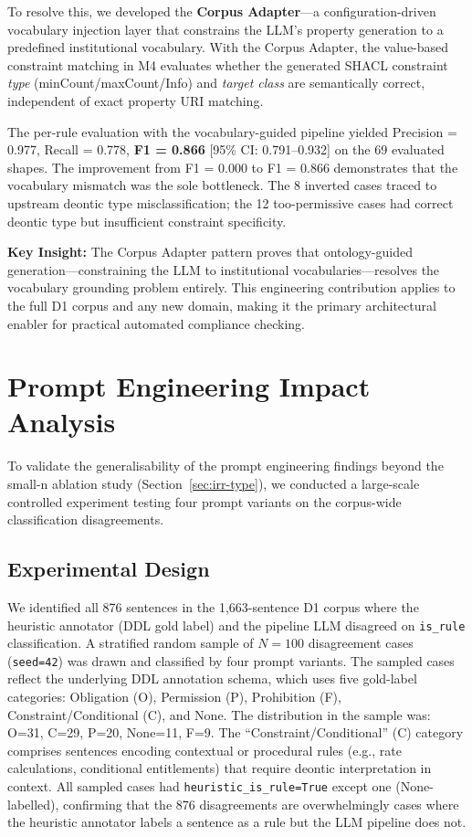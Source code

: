 To resolve this, we developed the \textbf{Corpus Adapter}---a configuration-driven vocabulary injection layer that constrains the LLM's property generation to a predefined institutional vocabulary. With the Corpus Adapter, the value-based constraint matching in M4 evaluates whether the generated SHACL constraint \textit{type} (minCount/maxCount/Info) and \textit{target class} are semantically correct, independent of exact property URI matching.

The per-rule evaluation with the vocabulary-guided pipeline yielded Precision = 0.977, Recall = 0.778, \textbf{F1 = 0.866} [95\% CI: 0.791--0.932] on the 69 evaluated shapes. The improvement from F1 = 0.000 to F1 = 0.866 demonstrates that the vocabulary mismatch was the sole bottleneck. The 8 inverted cases traced to upstream deontic type misclassification; the 12 too-permissive cases had correct deontic type but insufficient constraint specificity.

\textbf{Key Insight:} The Corpus Adapter pattern proves that ontology-guided generation---constraining the LLM to institutional vocabularies---resolves the vocabulary grounding problem entirely. This engineering contribution applies to the full D1 corpus and any new domain, making it the primary architectural enabler for practical automated compliance checking.

\section{Prompt Engineering Impact Analysis}
\label{sec:prompt-ablation-large}

To validate the generalisability of the prompt engineering findings beyond the small-n ablation study (Section~\ref{sec:irr-type}), we conducted a large-scale controlled experiment testing four prompt variants on the corpus-wide classification disagreements.

\subsection{Experimental Design}

We identified all 876 sentences in the 1,663-sentence D1 corpus where the heuristic annotator (DDL gold label) and the pipeline LLM disagreed on \texttt{is\_rule} classification. A stratified random sample of $N = 100$ disagreement cases (\texttt{seed=42}) was drawn and classified by four prompt variants. The sampled cases reflect the underlying DDL annotation schema, which uses five gold-label categories: Obligation (O), Permission (P), Prohibition (F), Constraint/Conditional (C), and None. The distribution in the sample was: O=31, C=29, P=20, None=11, F=9. The ``Constraint/Conditional'' (C) category comprises sentences encoding contextual or procedural rules (e.g., rate calculations, conditional entitlements) that require deontic interpretation in context. All sampled cases had \texttt{heuristic\_is\_rule=True} except one (None-labelled), confirming that the 876 disagreements are overwhelmingly cases where the heuristic annotator labels a sentence as a rule but the LLM pipeline does not.



